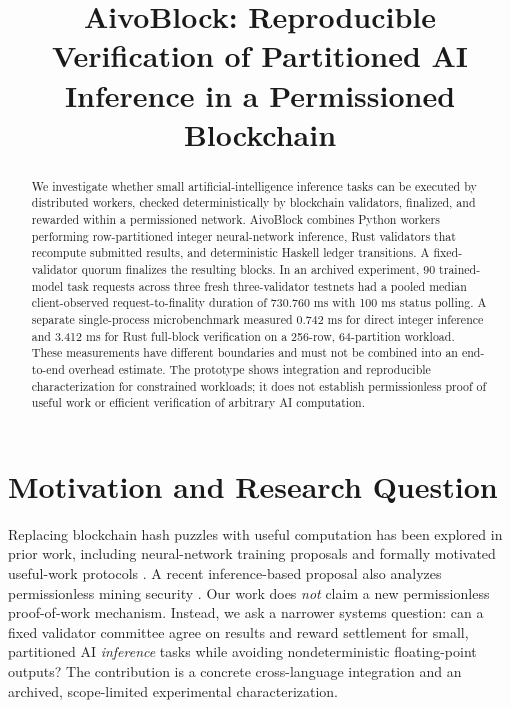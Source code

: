 \documentclass[sigconf,anonymous]{acmart}
\begin{document}
\title{AivoBlock: Reproducible Verification of Partitioned AI Inference in a Permissioned Blockchain}

\begin{abstract}
We investigate whether small artificial-intelligence inference tasks can be executed by distributed workers, checked deterministically by blockchain validators, finalized, and rewarded within a permissioned network. AivoBlock combines Python workers performing row-partitioned integer neural-network inference, Rust validators that recompute submitted results, and deterministic Haskell ledger transitions. A fixed-validator quorum finalizes the resulting blocks. In an archived experiment, 90 trained-model task requests across three fresh three-validator testnets had a pooled median client-observed request-to-finality duration of 730.760 ms with 100 ms status polling. A separate single-process microbenchmark measured 0.742 ms for direct integer inference and 3.412 ms for Rust full-block verification on a 256-row, 64-partition workload. These measurements have different boundaries and must not be combined into an end-to-end overhead estimate. The prototype shows integration and reproducible characterization for constrained workloads; it does not establish permissionless proof of useful work or efficient verification of arbitrary AI computation.
\end{abstract}

\maketitle

\section{Motivation and Research Question}
Replacing blockchain hash puzzles with useful computation has been explored in prior work, including neural-network training proposals \cite{baldominos2019coinai,lihu2020useful} and formally motivated useful-work protocols \cite{fitzi2022ofelimos}. A recent inference-based proposal also analyzes permissionless mining security \cite{wong2026poml}. Our work does \emph{not} claim a new permissionless proof-of-work mechanism. Instead, we ask a narrower systems question: can a fixed validator committee agree on results and reward settlement for small, partitioned AI \emph{inference} tasks while avoiding nondeterministic floating-point outputs? The contribution is a concrete cross-language integration and an archived, scope-limited experimental characterization.
\end{document}
